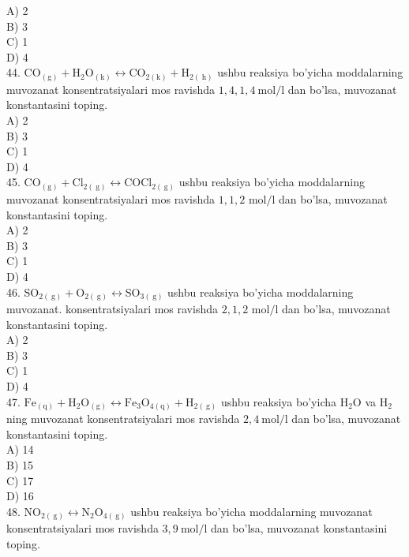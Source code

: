 A) 2\\
B) 3\\
C) 1\\
D) 4\\
44. $\mathrm{CO}_{(\mathrm{g})}+\mathrm{H}_{2} \mathrm{O}_{(\mathrm{k})} \leftrightarrow \mathrm{CO}_{2(\mathrm{k})}+\mathrm{H}_{2(\mathrm{~h})}$ ushbu reaksiya bo'yicha moddalarning muvozanat konsentratsiyalari mos ravishda $1,4,1,4 \mathrm{~mol} / \mathrm{l}$ dan bo'lsa, muvozanat konstantasini toping.\\
A) 2\\
B) 3\\
C) 1\\
D) 4\\
45. $\mathrm{CO}_{(\mathrm{g})}+\mathrm{Cl}_{2(\mathrm{~g})} \leftrightarrow \mathrm{COCl}_{2(\mathrm{~g})}$ ushbu reaksiya bo'yicha moddalarning muvozanat konsentratsiyalari mos ravishda $1,1,2$ $\mathrm{mol} / \mathrm{l}$ dan bo'lsa, muvozanat konstantasini toping.\\
A) 2\\
B) 3\\
C) 1\\
D) 4\\
46. $\mathrm{SO}_{2(\mathrm{~g})}+\mathrm{O}_{2(\mathrm{~g})} \leftrightarrow \mathrm{SO}_{3(\mathrm{~g})}$ ushbu reaksiya bo'yicha moddalarning muvozanat. konsentratsiyalari mos ravishda $2,1,2$ $\mathrm{mol} / \mathrm{l}$ dan bo'lsa, muvozanat konstantasini toping.\\
A) 2\\
B) 3\\
C) 1\\
D) 4\\
47. $\mathrm{Fe}_{(\mathrm{q})}+\mathrm{H}_{2} \mathrm{O}_{(\mathrm{g})} \leftrightarrow \mathrm{Fe}_{3} \mathrm{O}_{4(\mathrm{q})}+\mathrm{H}_{2(\mathrm{~g})}$ ushbu reaksiya bo'yicha $\mathrm{H}_{2} \mathrm{O}$ va $\mathrm{H}_{2}$ ning muvozanat konsentratsiyalari mos ravishda $2,4 \mathrm{~mol} / \mathrm{l}$ dan bo'lsa, muvozanat konstantasini toping.\\
A) 14\\
B) 15\\
C) 17\\
D) 16\\
48. $\mathrm{NO}_{2(\mathrm{~g})} \leftrightarrow \mathrm{N}_{2} \mathrm{O}_{4(\mathrm{~g})}$ ushbu reaksiya bo'yicha moddalarning muvozanat konsentratsiyalari mos ravishda $3,9 \mathrm{~mol} / \mathrm{l}$ dan bo'lsa, muvozanat konstantasini toping.\\
